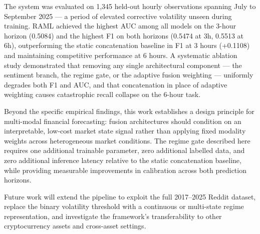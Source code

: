 \documentclass[journal]{IEEEtran}
\newcommand{\raml}{\textsc{RAML}}
\begin{document}
The system was evaluated on 1,345 held-out hourly observations spanning
July to September 2025 — a period of elevated corrective volatility unseen
during training. \raml{} achieved the highest AUC among all models on the
3-hour horizon (0.5084) and the highest F1 on both horizons (0.5474 at 3h,
0.5513 at 6h), outperforming the static concatenation baseline in F1 at 3 hours
(+0.1108) and maintaining competitive performance at 6 hours. A systematic
ablation study demonstrated that removing any single architectural component
— the sentiment branch, the regime gate, or the adaptive fusion weighting —
uniformly degrades both F1 and AUC, and that concatenation in place of adaptive
weighting causes catastrophic recall collapse on the 6-hour task.

Beyond the specific empirical findings, this work establishes a design
principle for multi-modal financial forecasting: fusion architectures should
condition on an interpretable, low-cost market state signal rather than applying
fixed modality weights across heterogeneous market conditions. The regime
gate described here requires one additional trainable parameter, zero
additional labelled data, and zero additional inference latency relative to
the static concatenation baseline, while providing measurable improvements in
calibration across both prediction horizons.

Future work will extend the pipeline to exploit the full 2017--2025 Reddit
dataset, replace the binary volatility threshold with a continuous or
multi-state regime representation, and investigate the framework's
transferability to other cryptocurrency assets and cross-asset settings.
\end{document}
